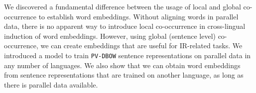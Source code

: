 
We discovered a fundamental difference between the usage of local and global co-occurrence to establish word embeddings. Without aligning words in parallel data, there is no apparent way to introduce local co-occurrence in cross-lingual induction of word embeddings. However, using global (sentence level) co-occurrence, we can create embeddings that are useful for IR-related tasks. We introduced a model to train {\tt PV-DBOW} sentence representations on parallel data in any number of languages. We also show that we can obtain word embeddings from sentence representations that are trained on another language, as long as there is parallel data available.